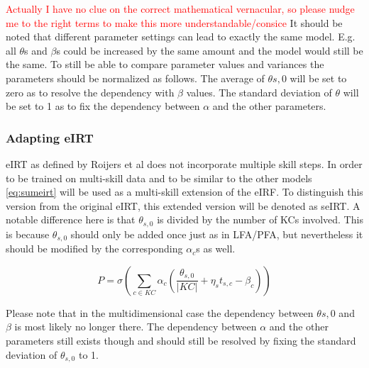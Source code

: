 \documentclass{scrartcl}
\newcommand\todo[1]{\textcolor{red}{#1}}
\begin{document}
\todo{Actually I have no clue on the correct mathematical vernacular, so please nudge me to the right terms to make this more understandable/consice}
It should be noted that different parameter settings can lead to exactly the same model. E.g. all $\theta$s and $\beta$s could be increased by the same amount and the model would still be the same. To still be able to compare parameter values and variances the parameters should be normalized as follows. The average of $\theta{s,0}$ will be set to zero as to resolve the dependency with $\beta$ values. The standard deviation of $\theta$ will be set to 1 as to fix the dependency between $\alpha$ and the other parameters.

\subsubsection{Adapting eIRT}
eIRT as defined by Roijers et al does not incorporate multiple skill steps. In order to be trained on multi-skill data and to be similar to the other models \ref{eq:sumeirt} will be used as a multi-skill extension of the eIRF. To distinguish this version from the original eIRT, this extended version will be denoted as seIRT. A notable difference here is that $\theta_{s,0}$ is divided by the number of KCs involved. This is because $\theta_{s,0}$ should only be added once just as in LFA/PFA, but nevertheless it should be modified by the corresponding $\alpha_{c}$s as well.

\begin{equation}
\label{eq:sumeirt}
P = \sigma(\sum_{c \in KC} \alpha_{c}(\frac{\theta_{s,0}}{|KC|} + \eta_{s} t_{s,c} - \beta_{c}))
\end{equation}

Please note that in the multidimensional case the dependency between $\theta{s,0}$ and $\beta$ is most likely no longer there. The dependency between $\alpha$ and the other parameters still exists though and should still be resolved by fixing the standard deviation of $\theta_{s,0}$ to 1.
\end{document}
